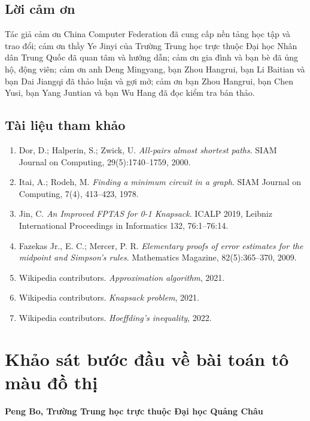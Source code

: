 \documentclass[11pt]{article}
\begin{document}
\subsection*{Lời cảm ơn}

Tác giả cảm ơn China Computer Federation đã cung cấp nền tảng học tập và trao
đổi; cảm ơn thầy Ye Jinyi của Trường Trung học trực thuộc Đại học Nhân dân
Trung Quốc đã quan tâm và hướng dẫn; cảm ơn gia đình và bạn bè đã ủng hộ, động
viên; cảm ơn anh Deng Mingyang, bạn Zhou Hangrui, bạn Li Baitian và bạn Dai
Jiangqi đã thảo luận và gợi mở; cảm ơn bạn Zhou Hangrui, bạn Chen Yusi, bạn
Yang Juntian và bạn Wu Hang đã đọc kiểm tra bản thảo.

\subsection*{Tài liệu tham khảo}

\begin{enumerate}
  \item Dor, D.; Halperin, S.; Zwick, U. \emph{All-pairs almost shortest
  paths}. SIAM Journal on Computing, 29(5):1740--1759, 2000.
  \item Itai, A.; Rodeh, M. \emph{Finding a minimum circuit in a graph}. SIAM
  Journal on Computing, 7(4), 413--423, 1978.
  \item Jin, C. \emph{An Improved FPTAS for 0-1 Knapsack}. ICALP 2019,
  Leibniz International Proceedings in Informatics 132, 76:1--76:14.
  \item Fazekas Jr., E. C.; Mercer, P. R. \emph{Elementary proofs of error
  estimates for the midpoint and Simpson's rules}. Mathematics Magazine,
  82(5):365--370, 2009.
  \item Wikipedia contributors. \emph{Approximation algorithm}, 2021.
  \item Wikipedia contributors. \emph{Knapsack problem}, 2021.
  \item Wikipedia contributors. \emph{Hoeffding's inequality}, 2022.
\end{enumerate}

\section{Khảo sát bước đầu về bài toán tô màu đồ thị}

\begin{center}
\textbf{Peng Bo, Trường Trung học trực thuộc Đại học Quảng Châu}
\end{center}
\end{document}
